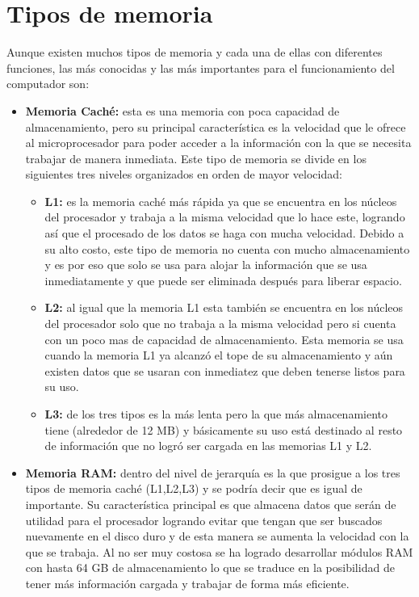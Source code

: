 \documentclass{article}
\begin{document}
\section{Tipos de memoria}
Aunque existen muchos tipos de memoria y cada una de ellas con diferentes funciones, las más conocidas y las más importantes para el funcionamiento del computador son:
\begin{itemize}
    \item \textbf{Memoria Caché:} esta es una memoria con poca capacidad de almacenamiento, pero su principal característica es la velocidad que le ofrece al microprocesador para poder acceder a la información con la que se necesita trabajar de manera inmediata. Este tipo de memoria se divide en los siguientes tres niveles organizados en orden de mayor velocidad:
    \begin{itemize}
        \item \textbf{L1:} es la memoria caché más rápida ya que se encuentra en los núcleos del procesador y trabaja a la misma velocidad que lo hace este, logrando así que el procesado de los datos se haga con mucha velocidad. Debido a su alto costo, este tipo de memoria no cuenta con mucho almacenamiento y es por eso que solo se usa para alojar la información que se usa inmediatamente y que puede ser eliminada después para liberar espacio.
        
        \item \textbf{L2:} al igual que la memoria L1 esta también se encuentra en los núcleos del procesador solo que no trabaja a la misma velocidad pero si cuenta con un poco mas de capacidad de almacenamiento. Esta memoria se usa cuando la memoria L1 ya alcanzó el tope de su almacenamiento y aún existen datos que se usaran con inmediatez que deben tenerse listos para su uso.
        
        \item \textbf{L3:} de los tres tipos es la más lenta pero la que más almacenamiento tiene (alrededor de 12 MB) y básicamente su uso está destinado al resto de información que no logró ser cargada en las memorias L1 y L2.
    \end{itemize}
    
    \item \textbf{Memoria RAM: } dentro del nivel de jerarquía es la que prosigue a los tres tipos de memoria caché (L1,L2,L3) y se podría decir que es igual de importante. Su característica principal es que almacena datos que serán de utilidad para el procesador logrando evitar que tengan que ser buscados nuevamente en el disco duro y de esta manera se aumenta la velocidad con la que se trabaja. Al no ser muy costosa se ha logrado desarrollar módulos RAM con hasta 64 GB de almacenamiento lo que se traduce en la posibilidad de tener más información cargada y trabajar de forma más eficiente.
    

\end{itemize}
\end{document}
